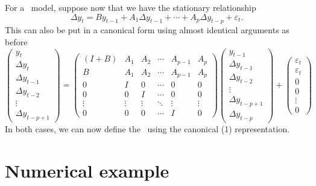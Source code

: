 \documentclass[12pt,fleqn]{article}
\newcommand{\vep}{\varepsilon}
\newcommand{\VECM}{\allcaps{VECM}}
\begin{document}
For a \VECM\ model, suppose now that we have the stationary
relationship
\begin{equation*}
  \Delta y_t = B y_{t-1} + A_1 \Delta y_{t-1} + \cdots + A_p \Delta
  y_{t-p} + \vep_t.
\end{equation*}
This can also be put in a canonical form using almost identical
arguments as before
\begin{equation*}
  \begin{pmatrix}
    y_t \\ \Delta y_t \\ \Delta y_{t-1} \\ \Delta y_{t-2} \\ \vdots \\
    \Delta y_{t-p+1}
  \end{pmatrix}
  =
  \begin{pmatrix}
    (I + B) & A_1 & A_2 & \cdots & A_{p-1} & A_p \\
    B & A_1 & A_2 & \cdots & A_{p-1} & A_p \\
    0 & I   & 0   & \cdots & 0 & 0 \\
    0 & 0   & I   & \cdots & 0 & 0 \\
    \vdots & \vdots & \vdots & \ddots & \vdots & \vdots \\
    0 & 0 & 0 & \cdots & I & 0
  \end{pmatrix}
  \begin{pmatrix}
    y_{t-1} \\ \Delta y_{t-1} \\ \Delta y_{t-2} \\ \vdots \\ \Delta y_{t-p+1} \\
    \Delta y_{t-p}
  \end{pmatrix}
  +
  \begin{pmatrix}
    \vep_t \\ \vep_t \\ 0 \\ 0 \\ \vdots \\ 0
  \end{pmatrix}
\end{equation*}
In both cases, we can now define the \IRF\ using the canonical \VAR(1)
representation.

\section{Numerical example}
\end{document}
